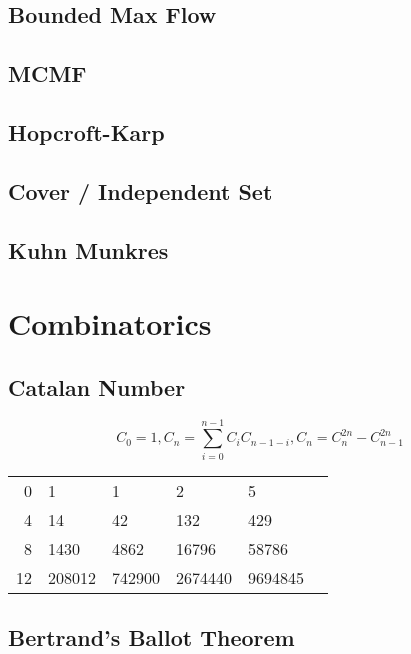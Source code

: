 \documentclass[a4paper,10pt,twocolumn,oneside]{article}
\begin{document}
\subsection{Bounded Max Flow}


\subsection{MCMF}


\subsection{Hopcroft-Karp}


\subsection{Cover / Independent Set}


\subsection{Kuhn Munkres}


\section{Combinatorics}

\subsection{Catalan Number}
$$
C_0=1, C_n=\sum_{i=0}^{n-1} C_i C_{n-1-i}, C_n=C_n^{2n}-C_{n-1}^{2n}
$$

\begin{center}
    \begin{tabular}{r|lllll}
        0 & 1 & 1 & 2 & 5 \\
        4 & 14 & 42 & 132 & 429 \\
        8 & 1430 & 4862 & 16796 & 58786 \\
        12 & 208012 & 742900 & 2674440 & 9694845
    \end{tabular}
\end{center}


\subsection{Bertrand's Ballot Theorem}
\end{document}

